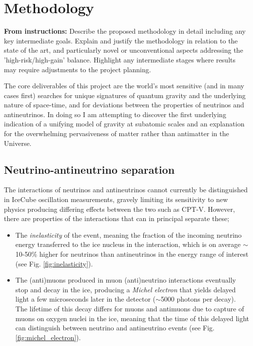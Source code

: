 \documentclass[a4paper,11pt]{article}
\begin{document}

\section{Methodology}
\vspace{0.1 cm}

\textbf{From instructions:} Describe the proposed methodology in detail including any key
intermediate goals. Explain and justify the methodology in relation to the state of the art, and
particularly novel or unconventional aspects addressing the 'high-risk/high-gain' balance. Highlight
any intermediate stages where results may require adjustments to the project planning. 


The core deliverables of this project are the world's most sensitive (and in many cases first) searches for unique signatures of quantum gravity and the underlying nature of space-time, and for deviations between the properties of neutrinos and antineutrinos. In doing so I am attempting to discover the first underlying indication of a unifying model of gravity at subatomic scales and an explanation for the overwhelming pervasiveness of matter rather than antimatter in the Universe. \\


\subsection{Neutrino-antineutrino separation}


The interactions of neutrinos and antineutrinos cannot currently be distinguished in IceCube oscillation measurements, gravely limiting its sensitivity to new physics producing differing effects between the two such as CPT-V. However, there are properties of the interactions that can in principal separate these;

\begin{itemize}
    \item The \textit{inelasticity} of the event, meaning the fraction of the incoming neutrino energy transferred to the ice nucleus in the interaction, which is on average $\sim$10-50\%  higher for neutrinos than antineutrinos in the energy range of interest (see Fig. \ref{fig:inelasticity}).
    \item The (anti)muons produced in muon (anti)neutrino interactions eventually stop and decay in the ice, producing a \textit{Michel electron} that yields delayed light a few microseconds later in the detector ($\sim$5000 photons per decay). The lifetime of this decay differs for muons and antimuons due to capture of muons on oxygen nuclei in the ice, meaning that the time of this delayed light can distinguish between neutrino and antineutrino events (see Fig. \ref{fig:michel_electron}). 
\end{itemize}
\end{document}
